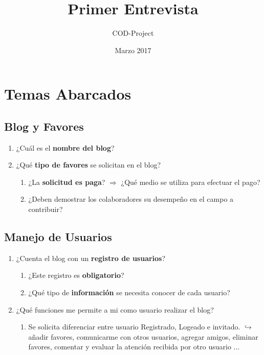\documentclass[a4paper,10pt]{article}
\title{Primer Entrevista}
\author{ COD-Project }
\date{Marzo 2017}
\begin{document}


\section{Temas Abarcados}
\subsection{Blog y Favores}
\begin{enumerate}
    \item ¿Cuál es el \textbf{nombre del blog}?
    \item ¿Qué \textbf{tipo de favores} se solicitan en el blog?
    \begin{enumerate}
        \item ¿La \textbf{solicitud es paga}? $\Rightarrow$ ¿Qué medio se utiliza para efectuar el pago?
        \item ¿Deben demostrar los colaboradores su desempeño en el campo a contribuir? 
    \end{enumerate}
\end{enumerate}

\subsection{Manejo de Usuarios}
\begin{enumerate}
    \item ¿Cuenta el blog con un \textbf{registro de usuarios}?
    \begin{enumerate}
        \item ¿Este registro es \textbf{obligatorio}? 
        \item ¿Qué tipo de \textbf{información} se necesita conocer de cada usuario?
    \end{enumerate}
    \item ¿Qué funciones me permite a mi como usuario realizar el blog?
    \begin{enumerate}
        \item Se solicita diferenciar entre usuario Registrado, Logeado e invitado.
        \subitem $\hookrightarrow{}$añadir favores, comunicarme con otros usuarios, agregar amigos, eliminar favores, comentar y evaluar la atención recibida por otro usuario $\ldots$
    \end{enumerate}
\end{enumerate}
\end{document}
